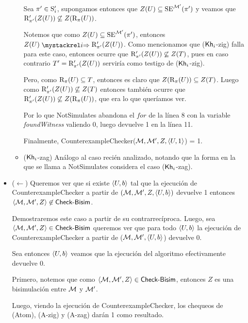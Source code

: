 \begin{demostracion}
\begin{itemize}
\begin{itemize}
            Sea $\pi' \in \S'_i$, supongamos entonces que $Z(U) \subseteq \sexec^{\model'}(\pi')$ y veamos que 
            $\R'_{\pi'}(Z(U)) \not \subseteq Z(\R_\pi(U))$.

            Notemos que como $Z(U) \subseteq \sexec^{\model'}(\pi')$, entonces $Z(U) \ultsExecAgi \R'_{\pi'}(Z(U))$. 
            Como mencionamos que ($\khi$-zig) falla para este caso, entonces ocurre que 
            $\R'_{\pi'}(Z(U)) \not \subseteq Z(T)$, pues en caso contrario $T' = \R'_{\pi'}(Z(U))$ serviría como 
            testigo de ($\khi$-zig).

            Pero, como $\R_\pi(U) \subseteq T$, entonces es claro que $Z(\R_\pi(U)) \subseteq Z(T)$. Luego como 
            $\R'_{\pi'}(Z(U)) \not \subseteq Z(T)$ entonces también ocurre que $\R'_{\pi'}(Z(U)) \not \subseteq Z(\R_\pi(U))$, 
            que era lo que queríamos ver.

            Por lo que \textsf{NotSimulates} abandona el $for$ de la línea 8 con la variable \textit{foundWitness} valiendo 0, luego 
            devuelve 1 en la línea 11.

            Finalmente, \textsf{CounterexampleChecker}($\modults,\modults',Z,\tup{U,1}$) = 1.

            \item ($\khi$-zag) Análogo al caso recién analizado, notando que la forma en la que se llama a \textsf{NotSimulates}
            considera el caso ($\khi$-zag).
        \end{itemize}

        \item ($\leftarrow$) Queremos ver que si existe $\tup{U,b}$ tal que la ejecución de \textsf{CounterexampleChecker} a partir de 
        $(\model,\model',Z,\tup{U,b})$ devuelve 1 entonces $\tup{\model,\model',Z} \not\in \CBisim$. 

        Demostraremos este caso a partir de su contrarrecíproca. Luego, 
        sea $\tup{\modults,\modults',Z} \in \CBisim$ queremos ver que para todo $\tup{U,b}$ la ejecución de \textsf{CounterexampleChecker} 
        a partir de ($\modults,\modults',\tup{U,b}$) devuelve 0.

        Sea entonces $\tup{U,b}$ veamos que la ejecución del algoritmo efectivamente devuelve 0.

        Primero, notemos que como $\tup{\modults,\modults',Z} \in \CBisim$, entonces $Z$ es una bisimulación 
        entre $\modults$ y $\modults'$.

        Luego, viendo la ejecución de \textsf{CounterexampleChecker}, los chequeos de (Atom), (A-zig) y (A-zag) darán 1 como resultado.
        

\end{itemize}
\end{demostracion}
